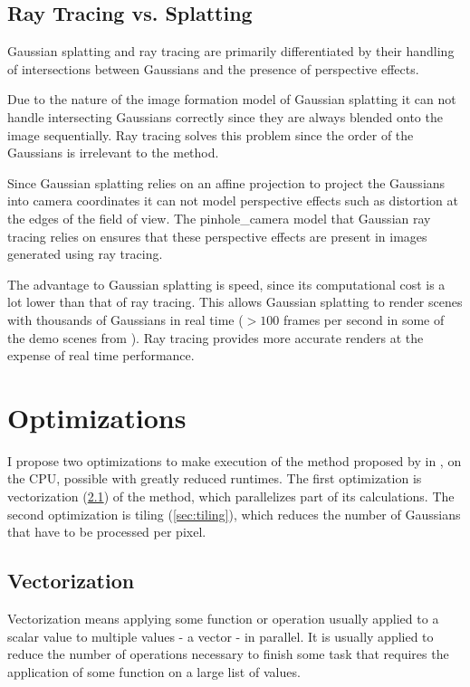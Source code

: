 \documentclass[a4paper, 11pt]{memoir}
\begin{document}
    \section{Ray Tracing vs. Splatting}
    \label{sec:ray_v_splat}
    Gaussian splatting and ray tracing are primarily differentiated by their handling of intersections between Gaussians
    and the presence of perspective effects.

    Due to the nature of the image formation model of Gaussian splatting it can not handle intersecting Gaussians correctly
    since they are always blended onto the image sequentially. Ray tracing solves this problem since the order of the
    Gaussians is irrelevant to the method.

    Since Gaussian splatting relies on an affine projection to project the Gaussians into camera coordinates it can not
    model perspective effects such as distortion at the edges of the field of view. The \gls{pinhole_camera} model that
    Gaussian ray tracing relies on ensures that these perspective effects are present in images generated using ray
    tracing.

    The advantage to Gaussian splatting is speed, since its computational cost is a lot lower than that of ray tracing.
    This allows Gaussian splatting to render scenes with thousands of Gaussians in real time ($>100$ frames per second
    in some of the demo scenes from \cite{kerbl3Dgaussians}). Ray tracing provides more accurate renders at the expense
    of real time performance.

    \chapter{Optimizations}
    \label{ch:optimizations}
    I propose two optimizations to make execution of the method proposed by \citeauthor{Rhodin:2015}
    in \cite{Rhodin:2015}, on the CPU, possible with greatly reduced runtimes.
    The first optimization is vectorization (\ref{sec:vectorization}) of the method, which parallelizes part of its
    calculations. The second optimization is tiling (\ref{sec:tiling}), which reduces the number of Gaussians
    that have to be processed per pixel.

    \section{Vectorization}
    \label{sec:vectorization}
    Vectorization means applying some function or operation usually applied to a scalar value to multiple values - a
    vector - in parallel. It is usually applied to reduce the number of operations necessary to finish some task that
    requires the application of some function on a large list of values.
\end{document}
